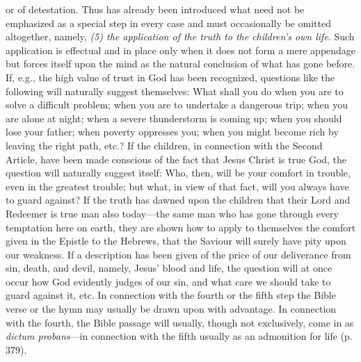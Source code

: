 or of detestation. Thus has already been introduced what need not be emphasized as a special step in every case and must occasionally be omitted altogether, namely, \emph{(5) the application of the truth to the children’s own life}. Such application is effectual and in place only when it does not form a mere appendage but forces itself upon the mind as the natural conclusion of what has gone before. If, e.g., the high value of trust in God has been recognized, questions like the following will naturally suggest themselves: What shall you do when you are to solve a difficult problem; when you are to undertake a dangerous trip; when you are alone at night; when a severe thunderstorm is coming up; when you should lose your father; when poverty oppresses you; when you might become rich by leaving the right path, etc.? If the children, in connection with the Second Article, have been made conscious of the fact that Jesus Christ is true God, the question will naturally suggest itself: Who, then, will be your comfort in trouble, even in the greatest trouble; but what, in view of that fact, will you always have to guard against? If the truth has dawned upon the children that their Lord and Redeemer is true man also today—the same man who has gone through every temptation here on earth, they are shown how to apply to themselves the comfort given in the Epistle to the Hebrews, that the Saviour will surely have pity upon our weakness. If a description has been given of the price of our deliverance from sin, death, and devil, namely, Jesus’ blood and life, the question will at once occur how God evidently judges of our sin, and what care we should take to guard against it, etc. In connection with the fourth or the fifth step the Bible verse or the hymn may usually be drawn upon with advantage. In connection with the fourth, the Bible passage will usually, though not exclusively, come in as \emph{dictum probans}—in connection with the fifth usually as an admonition for life (p. 379).
